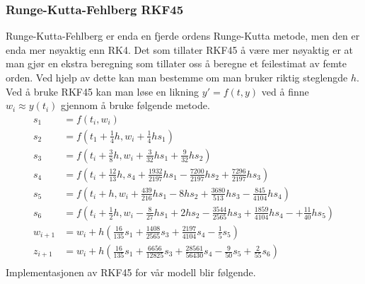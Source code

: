 \subsubsection{Runge-Kutta-Fehlberg RKF45}
Runge-Kutta-Fehlberg er enda en fjerde ordens Runge-Kutta metode, men den er enda mer nøyaktig enn RK4. Det som tillater RKF45 å være mer nøyaktig er at man gjør en ekstra beregning som tillater oss å beregne et feilestimat av femte orden. Ved hjelp av dette kan man bestemme om man bruker riktig steglengde $h$.\newline\newline
Ved å bruke RKF45 kan man løse en likning $y' = f(t, y)$ ved å finne $w_i \approx y(t_i)$ gjennom å bruke følgende metode. 
\begin{equation}
\begin{aligned}
    s_1&=f(t_i, w_i)\\
    s_2&=f(t_1+\frac{1}{4}h, w_i + \frac{1}{4}hs_1)\\
    s_3&=f(t_i+\frac{3}{8}h, w_i+\frac{3}{32}hs_1+\frac{9}{32}hs_2)\\
    s_4&=f(t_i+\frac{12}{13}h, s_4+\frac{1932}{2197}hs_1-\frac{7200}{2197}hs_2+\frac{7296}{2197}hs_3)\\
    s_5&=f(t_i+h, w_i + \frac{439}{216}hs_1-8hs_2+\frac{3680}{513}hs_3-\frac{845}{4104}hs_4)\\
    s_6&=f(t_i+\frac{1}{2}h, w_i-\frac{8}{27}hs_1+2hs_2-\frac{3544}{2565}hs_3+\frac{1859}{4104}hs_4-+\frac{11}{40}hs_5)\\
    w_{i+1}&=w_i+h(\frac{16}{135}s_1+\frac{1408}{2565}s_3+\frac{2197}{4104}s_4-\frac{1}{5}s_5)\\
    z_{i+1}&=w_i+h(\frac{16}{135}s_1+\frac{6656}{12825}s_3+\frac{28561}{56430}s_4-\frac{9}{50}s_5+\frac{2}{55}s_6)\\
\end{aligned}
\end{equation}
Implementasjonen av RKF45 for vår modell blir følgende.

